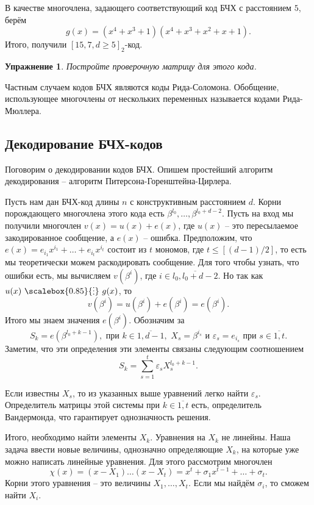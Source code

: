 \documentclass[12pt,a4paper,oneside]{book}
\newtheorem{uprz}{\color{violet!100!black} Упражнение}
\theoremstyle{definition}
\renewcommand{\leq}{\leqslant}
\renewcommand{\geq}{\geqslant}
\newcommand{\ovl}{\overline}
\newcommand{\di}{\mathop{\,\scalebox{0.85}{\raisebox{-1.2pt}[0.5\height]{\vdots}}\,}}
\def\eps{\varepsilon}
\def\upr{\begin{uprz}}
\def\eupr{\end{uprz}}
\begin{document}
В качестве многочлена, задающего соответствующий код БЧХ с расстоянием $5$, берём $$g(x)=(x^4+x^3+1)(x^4+x^3+x^2+x+1).$$
Итого, получили $[15,7,d\geq 5]_2$-код.

\upr Постройте проверочную матрицу для этого кода.
\eupr

Частным случаем кодов БЧХ являются коды Рида-Соломона. Обобщение, использующее многочлены от нескольких переменных называется кодами Рида-Мюллера.

\subsection{Декодирование БЧХ-кодов}

Поговорим о декодировании кодов БЧХ. Опишем простейший алгоритм декодирования -- алгоритм Питерсона-Горенштейна-Цирлера.

Пусть нам дан БЧХ-код длины $n$ с конструктивным расстоянием $d$. Корни порождающего многочлена этого кода есть $\beta^{l_0},\dots, \beta^{l_0+d-2}$.
Пусть на вход мы получили многочлен $v(x)=u(x)+e(x)$, где $u(x)$ -- это пересылаемое закодированное сообщение, а $e(x)$ -- ошибка. Предположим, что $e(x)=e_{i_1}x^{i_1}+\dots +e_{i_t}x^{i_t}$ состоит из $t$ мономов, где $t\leq [(d-1)/2]$, то есть мы теоретически можем раскодировать сообщение. Для того чтобы узнать, что ошибки есть, мы вычисляем $v(\beta^{i})$, где $i\in \ovl{l_0, l_0+d-2}$. Но так как $u(x) \di g(x)$, то
$$v(\beta^{i})=u(\beta^i)+e(\beta^i)=e(\beta^i).$$
Итого мы знаем значения $e(\beta^i)$. Обозначим за
$$S_k= e(\beta^{l_0+k-1}), \text{ при } k\in \ovl{1,d-1}, \,\, X_s=\beta^{i_s} \text{ и } \eps_s=e_{i_s} \text{ при } s\in \ovl{1,t}.$$
Заметим, что эти определения эти элементы связаны следующим соотношением 
$$S_k=\sum_{s=1}^t \eps_s X_s^{l_0+k-1}.$$

Если известны $X_s$, то из указанных выше уравнений легко найти $\eps_s$. Определитель матрицы этой системы при $k\in\ovl{1,t}$ есть,  определитель Вандермонда, что гарантирует однозначность решения.

Итого, необходимо найти элементы $X_k$. Уравнения на $X_k$ не линейны. Наша задача ввести новые величины, однозначно определяющие $X_k$, на которые уже можно написать линейные уравнения. Для этого рассмотрим многочлен 
$$\chi(x)=(x-X_1)\dots(x-X_t)= x^t+\sigma_1x^{t-1}+\dots+\sigma_t.$$
Корни этого уравнения -- это величины $X_1,\dots,X_t$. Если мы найдём $\sigma_i$, то сможем найти $X_i$.
\end{document}
